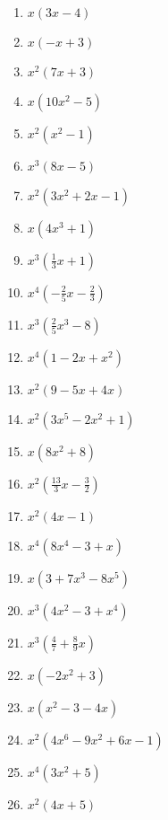 \begin{Answer}[ref=ausklammernA1]\\
	\begin{minipage}{\textwidth}
		\begin{minipage}{0.44\textwidth}
			\begin{enumerate}[label=\alph*)]
				\item \(x\left( 3x-4\right)\)
				\item \(x\left(-x+3\right)\)
				\item \(x^2\left(7x+3\right)\)
				\item \(x\left(10x^2-5\right)\)
				\item \(x^2\left(x^2-1\right)\)
				\item \(x^3\left(8x-5\right)\)
				\item \(x^2\left(3x^2+2x-1\right)\)
				\item \(x\left(4x^3+1\right)\)
				\item \(x^3\left(\frac{1}{3}x+1\right)\)
				\item \(x^4\left(-\frac{2}{5}x-\frac{2}{3}\right)\)
				\item \(x^3\left(\frac{2}{5}x^3-8\right)\)
				\item \(x^4\left(1-2x+x^2\right)\)
				\item \(x^2\left(9-5x+4x\right)\)
			\end{enumerate}
		\end{minipage}
		\begin{minipage}{0.54\textwidth}
			\begin{enumerate}[label=\alph*)]
				\setcounter{enumi}{13}
				\item \(x^2\left(3x^5-2x^2+1\right)\)
				\item \(x\left(8x^2+8\right)\)
				\item \(x^2\left(\frac{13}{3}x-\frac{3}{2}\right)\)
				\item \(x^2\left(4x-1\right)\)
				\item \(x^4\left(8x^4-3+x\right)\)
				\item \(x\left(3+7x^3-8x^5\right)\)
				\item \(x^3\left(4x^2-3+x^4\right)\)
				\item \(x^3\left(\frac{4}{7}+\frac{8}{9}x\right)\)
				\item \(x\left(-2x^2+3\right)\)
				\item \(x\left(x^2-3-4x\right)\)
				\item \(x^2\left(4x^6-9x^2+6x-1\right)\)
				\item \(x^4\left(3x^2+5\right)\)
				\item \(x^2\left(4x+5\right)\)
			\end{enumerate}
		\end{minipage}
	\end{minipage}
\end{Answer}
